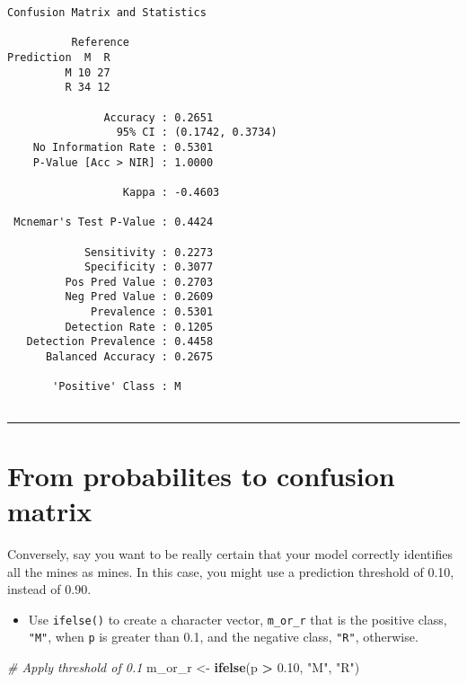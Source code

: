 \documentclass[]{book}
\newenvironment{Shaded}{\begin{snugshade}}{\end{snugshade}}
\newcommand{\KeywordTok}[1]{\textcolor[rgb]{0.13,0.29,0.53}{\textbf{#1}}}
\newcommand{\FloatTok}[1]{\textcolor[rgb]{0.00,0.00,0.81}{#1}}
\newcommand{\StringTok}[1]{\textcolor[rgb]{0.31,0.60,0.02}{#1}}
\newcommand{\CommentTok}[1]{\textcolor[rgb]{0.56,0.35,0.01}{\textit{#1}}}
\newcommand{\OperatorTok}[1]{\textcolor[rgb]{0.81,0.36,0.00}{\textbf{#1}}}
\newcommand{\NormalTok}[1]{#1}
\providecommand{\tightlist}{%
  \setlength{\itemsep}{0pt}\setlength{\parskip}{0pt}}
\begin{document}
\begin{verbatim}
Confusion Matrix and Statistics

          Reference
Prediction  M  R
         M 10 27
         R 34 12
                                          
               Accuracy : 0.2651          
                 95% CI : (0.1742, 0.3734)
    No Information Rate : 0.5301          
    P-Value [Acc > NIR] : 1.0000          
                                          
                  Kappa : -0.4603         
                                          
 Mcnemar's Test P-Value : 0.4424          
                                          
            Sensitivity : 0.2273          
            Specificity : 0.3077          
         Pos Pred Value : 0.2703          
         Neg Pred Value : 0.2609          
             Prevalence : 0.5301          
         Detection Rate : 0.1205          
   Detection Prevalence : 0.4458          
      Balanced Accuracy : 0.2675          
                                          
       'Positive' Class : M               
                                          
\end{verbatim}

\begin{center}\rule{0.5\linewidth}{\linethickness}\end{center}

\section{From probabilites to confusion
matrix}\label{from-probabilites-to-confusion-matrix}

Conversely, say you want to be really certain that your model correctly
identifies all the mines as mines. In this case, you might use a
prediction threshold of 0.10, instead of 0.90.

\begin{itemize}
\tightlist
\item
  Use \texttt{ifelse()} to create a character vector, \texttt{m\_or\_r}
  that is the positive class, \texttt{"M"}, when \texttt{p} is greater
  than 0.1, and the negative class, \texttt{"R"}, otherwise.
\end{itemize}

\begin{Shaded}
\begin{Highlighting}[]
\CommentTok{# Apply threshold of 0.1}
\NormalTok{m_or_r <-}\StringTok{ }\KeywordTok{ifelse}\NormalTok{(p }\OperatorTok{>}\StringTok{ }\FloatTok{0.10}\NormalTok{, }\StringTok{"M"}\NormalTok{, }\StringTok{"R"}\NormalTok{)}
\end{Highlighting}
\end{Shaded}
\end{document}
